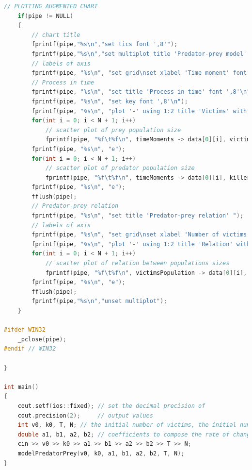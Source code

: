 \documentclass[11pt]{article}
\begin{document}
\begin{lstlisting}[language=C++, caption=Implementation of Predator-prey model]
    // PLOTTING AUGMENTED CHART
    if(pipe != NULL)
    {
        // chart title
        fprintf(pipe,"%s\n","set tics font ',8'");
        fprintf(pipe,"%s\n","set multiplot title 'Predator-prey model' font ',12' layout 1,2");
        // labels of axis
        fprintf(pipe, "%s\n", "set grid\nset xlabel 'Time moment' font ',8'\nset ylabel 'Number of individuals' font ',8'\n");
        // Process in time
        fprintf(pipe, "%s\n", "set title 'Process in time' font ',8'\n");
        fprintf(pipe, "%s\n", "set key font ',8'\n");
        fprintf(pipe, "%s\n", "plot '-' using 1:2 title 'Victims' with lines, '-' using 1:2 title 'Killers' with lines");
        for(int i = 0; i < N + 1; i++)
            // scatter plot of prey population size
            fprintf(pipe, "%f\t%f\n", timeMoments -> data[0][i], victimsPopulation -> data[0][i]);
        fprintf(pipe, "%s\n", "e");
        for(int i = 0; i < N + 1; i++)
            // scatter plot of predator population size
            fprintf(pipe, "%f\t%f\n", timeMoments -> data[0][i], killerPopulation -> data[0][i]);
        fprintf(pipe, "%s\n", "e");
        fflush(pipe);
        // Predator-prey relation
        fprintf(pipe, "%s\n", "set title 'Predator-prey relation' ");
        // labels of axis
        fprintf(pipe, "%s\n", "set grid\nset xlabel 'Number of victims' font ',8'\nset ylabel 'Number of killers' font ',8'\n");
        fprintf(pipe, "%s\n", "plot '-' using 1:2 title 'Relation' with lines");
        for(int i = 0; i < N + 1; i++)
            // scatter plot of relation between populations sizes
            fprintf(pipe, "%f\t%f\n", victimsPopulation -> data[0][i], killerPopulation -> data[0][i]);
        fprintf(pipe, "%s\n", "e");
        fflush(pipe);
        fprintf(pipe,"%s\n","unset multiplot");
    }

#ifdef WIN32
    _pclose(pipe);
#endif // WIN32

}

int main()
{
    cout.setf(ios::fixed); // set the decimal precision of
    cout.precision(2);     // output values
    int v0, k0, T, N; // the initial number of victims, the initial number of killers, the time limit, the number of the points of approximation resp.
    double a1, b1, a2, b2; // coefficients to compose the rate of change of victim and killer populations
    cin >> v0 >> k0 >> a1 >> b1 >> a2 >> b2 >> T >> N;
    modelPredatorPrey(v0, k0, a1, b1, a2, b2, T, N);
}

\end{lstlisting}
\end{document}
